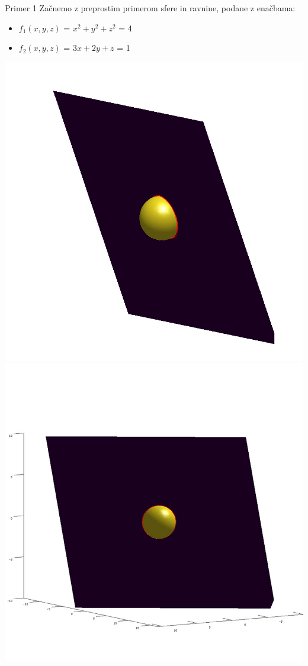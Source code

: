 \documentclass{beamer}
\begin{document}
\begin{frame}{Primer 1}
	Začnemo z preprostim primerom sfere in ravnine, podane z enačbama:\\
	
	\begin{itemize} 
		\item $f_{1}(x,y,z)$ = $x^2 + y^2 + z^2$ = 4
		\item $f_{2}(x,y,z)$ = $3x + 2y + z$ = 1	
	\end{itemize} 
	\includegraphics[scale=0.3]{primer1_1}
	\includegraphics[scale=0.3]{primer1_2}
\end{frame}
\end{document}

